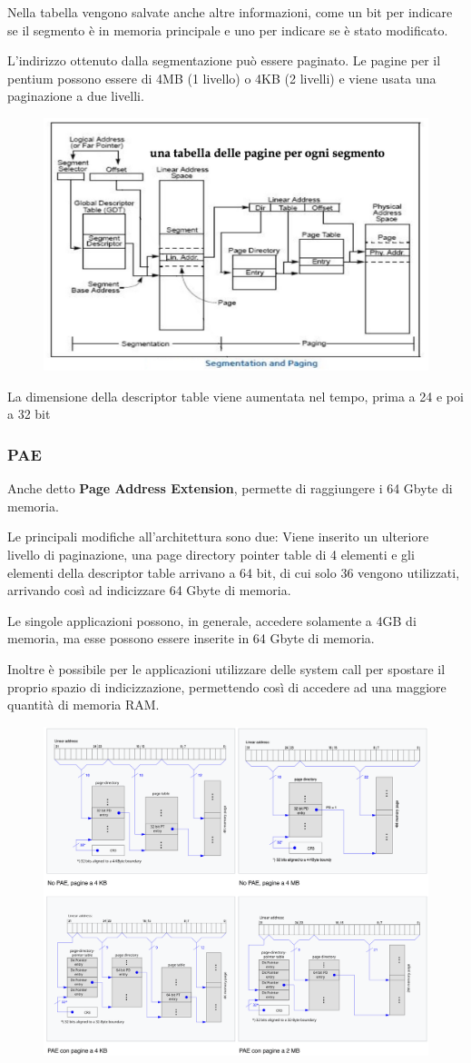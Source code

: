 Nella tabella vengono salvate anche altre informazioni, come un bit per indicare se il segmento è in memoria principale e uno per indicare se è stato modificato.

L'indirizzo ottenuto dalla segmentazione può essere paginato. Le pagine per il pentium possono essere di 4MB (1 livello) o 4KB (2 livelli) e viene usata una paginazione a due livelli.

\begin{figure}[H]
    \centering
    \includegraphics[width=0.5\linewidth]{assets/intel32-3.jpg}
\end{figure}

La dimensione della descriptor table viene aumentata nel tempo, prima a 24 e poi a 32 bit

\subsubsection{PAE}
Anche detto \textbf{Page Address Extension}, permette di raggiungere i 64 Gbyte di memoria.

Le principali modifiche all'architettura sono due: Viene inserito un ulteriore livello di paginazione, una page directory pointer table di 4 elementi e gli elementi della descriptor table arrivano a 64 bit, di cui solo 36 vengono utilizzati, arrivando così ad indicizzare 64 Gbyte di memoria.

\spacer
Le singole applicazioni possono, in generale, accedere solamente a 4GB di memoria, ma esse possono essere inserite in 64 Gbyte di memoria.

Inoltre è possibile per le applicazioni utilizzare delle system call per spostare il proprio spazio di indicizzazione, permettendo così di accedere ad una maggiore quantità di memoria RAM.

\begin{figure}[H]
    \centering
    \includegraphics[width=0.75\linewidth]{assets/pae.png}
\end{figure}

